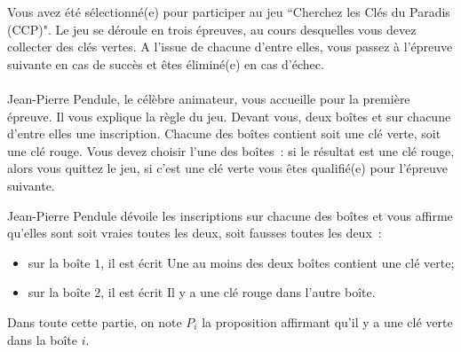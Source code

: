 \documentclass[11pt,a4paper]{article}
\begin{document}
\begin{Exercise}[title = {Logique et calcul des propositions}, origin = {\bac \; {\sc ccinp 2018 - mp}}]
	Vous avez été sélectionné(e) pour participer au jeu ``Cherchez les Clés du Paradis (CCP)".
	Le jeu se déroule en trois épreuves, au cours desquelles vous devez collecter des clés vertes.
	A l'issue de chacune d'entre elles, vous passez à l'épreuve suivante en cas de succès et êtes éliminé(e) en cas d'échec.\\

	\ExePart[name = {Première épreuve}]\\
	Jean-Pierre Pendule, le célèbre animateur, vous accueille pour la première épreuve.
	Il vous explique la règle du jeu.
	Devant vous, deux boîtes et sur chacune d'entre elles une inscription.
	Chacune des boîtes contient soit une clé verte, soit une clé rouge.
	Vous devez choisir l'une des boîtes~: si le résultat est une clé rouge, alors vous quittez le jeu, si c'est une clé verte vous êtes qualifié(e) pour l'épreuve suivante.

	Jean-Pierre Pendule dévoile les inscriptions sur chacune des boîtes et vous affirme qu'elles sont soit vraies toutes les deux, soit fausses toutes les deux~:
	\begin{itemize}
		\item sur la boîte $1$, il est écrit \og{}Une au moins des deux boîtes contient une clé verte\fg{};
		\item  sur la boîte $2$, il est écrit \og{}Il y a une clé rouge dans l'autre boîte\fg{}.
	\end{itemize}
	Dans toute cette partie, on note $P_i$ la proposition affirmant qu'il y a une clé verte dans la boîte $i$.
	\\


\end{Exercise}
\end{document}
